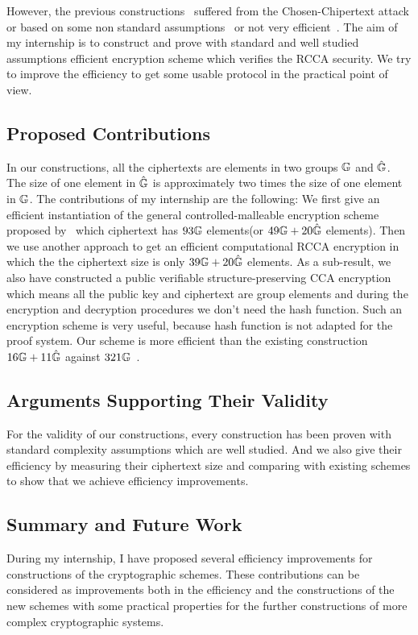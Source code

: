 However, the previous constructions~\cite{DBLP:conf/ctrsa/GolleJJS04} suffered from the Chosen-Chipertext attack or based on some non standard assumptions~\cite{DBLP:conf/crypto/PrabhakaranR07} or not very efficient~\cite{DBLP:conf/eurocrypt/ChaseKLM12}.
The aim of my internship is to construct and prove with standard and well studied assumptions efficient encryption scheme which verifies the RCCA security.
We try to improve the efficiency to get some usable protocol in the practical point of view.

\subsection*{Proposed Contributions}
In our constructions, all the ciphertexts are elements in two groups $\mathbb{G}$ and $\hat{\mathbb{G}}$.
The size of one element in $\hat{\mathbb{G}}$ is approximately two times the size of one element in $\mathbb{G}$.
The contributions of my internship are the following:
We first give an efficient instantiation of the general controlled-malleable encryption scheme proposed by~\cite{DBLP:conf/eurocrypt/ChaseKLM12} which ciphertext has $93\mathbb{G}$ elements(or $49\mathbb{G} + 20\hat{\mathbb{G}}$ elements).
Then we use another approach to get an efficient computational RCCA encryption in which the the ciphertext size is only $39\mathbb{G} + 20 \hat{\mathbb{G}}$ elements.
As a sub-result, we also have constructed a public verifiable structure-preserving CCA encryption which means all the public key and ciphertext are group elements and during the encryption and decryption procedures we don't need the hash function.
Such an encryption scheme is very useful, because hash function is not adapted for the proof system.
Our scheme is more efficient than the existing construction $16\mathbb{G} + 11\hat{\mathbb{G}}$ against $321\mathbb{G}$~\cite{DBLP:conf/pkc/AbeDKNO13}.

\subsection*{Arguments Supporting Their Validity}
For the validity of our constructions,
every construction has been proven with standard complexity assumptions which are well studied.
And we also give their efficiency by measuring their ciphertext size and comparing with existing schemes to show that we achieve efficiency improvements.

\subsection*{Summary and Future Work}
During my internship, I have proposed several efficiency improvements for constructions of the cryptographic schemes.
These contributions can be considered as improvements both in the efficiency and the constructions of the new schemes with some practical properties for the further constructions of more complex cryptographic systems.

